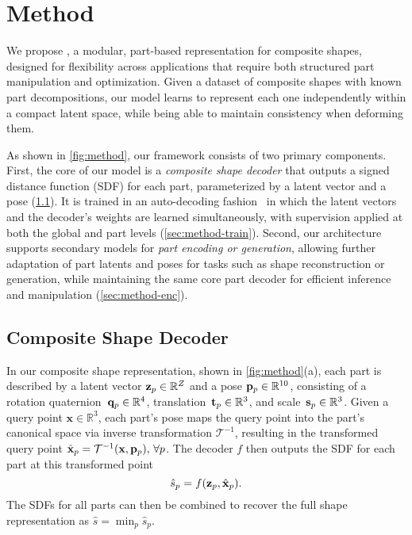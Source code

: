 
\section{Method}
\label{sec:method}



We propose \PSDF{}, a modular, part-based representation for composite shapes, designed for flexibility across applications that require both structured part manipulation and optimization. Given a dataset of composite shapes with known part decompositions, our model learns to represent each one independently within a compact latent space, while being able to maintain consistency when deforming them.  

As shown in \cref{fig:method}, our framework consists of two primary components.
First, the core of our model is a \textit{composite shape decoder} that outputs a signed distance function (SDF) for each part, parameterized by a latent vector and a pose (\cref{sec:method-dec}). It is trained in an auto-decoding fashion~\cite{Park19c} in which the latent vectors and the decoder's weights are learned simultaneously, with supervision applied at both the global and part levels (\cref{sec:method-train}). 
Second, our architecture supports secondary models for \textit{part encoding or generation}, allowing further adaptation of part latents and poses for tasks such as shape reconstruction or generation, while maintaining the same core part decoder for efficient inference and manipulation (\cref{sec:method-enc}).


\subsection{Composite Shape Decoder}
\label{sec:method-dec}

In our composite shape representation, shown in \cref{fig:method}(a), each part is described by a latent vector $\mathbf{z}_p\in\mathbb{R}^Z$ and a pose $\mathbf{p}_p\in\mathbb{R}^{10}$, consisting of a rotation quaternion~$\mathbf{q}_p\in\mathbb{R}^4$, translation~$\mathbf{t}_p\in\mathbb{R}^3$, and scale~$\mathbf{s}_p\in\mathbb{R}^3$. Given a query point $\mathbf{x} \in \mathbb{R}^3$, each part’s pose maps the query point into the part’s canonical space via inverse transformation $\mathcal{T}^{-1}$, resulting in the transformed query point $\hat{\mathbf{x}}_p = \mathcal{T}^{-1}(\mathbf{x}, \mathbf{p}_p), \,\forall p$. The decoder $f$ then outputs the SDF for each part at this transformed point 
%
\begin{equation} 
	\hat{s}_p = f(\mathbf{z}_p, \hat{\mathbf{x}}_p).
\end{equation}
%
The SDFs for all parts can then be combined to recover the full shape representation as $\hat{s} = \min_p{\hat{s}_p}$.

